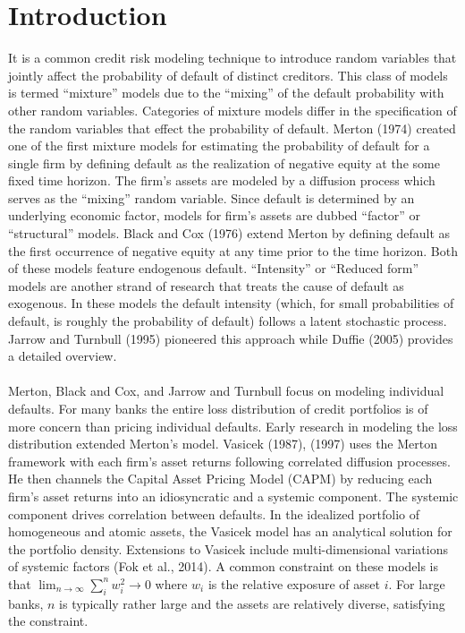 \documentclass[12pt]{article}
\theoremstyle{definition}
\begin{document}
\newpage
\section{Introduction}
It is a common credit risk modeling technique to introduce random variables that jointly affect the probability of default of distinct creditors.  This class of models is termed ``mixture'' models due to the ``mixing'' of the default probability with other random variables.  Categories of mixture models differ in the specification of the random variables that effect the probability of default.  Merton (1974) created one of the first mixture models for estimating the probability of default for a single firm by defining default as the realization of negative equity at the some fixed time horizon.  The firm's assets are modeled by a diffusion process which serves as the ``mixing'' random variable.  Since default is determined by an underlying economic factor, models for firm's assets are dubbed ``factor'' or ``structural'' models.  Black and Cox (1976) extend Merton by defining default as the first occurrence of negative equity at any time prior to the time horizon.  Both of these models feature endogenous default.  ``Intensity'' or ``Reduced form'' models are another strand of research that treats the cause of default as exogenous.  In these models the default intensity (which, for small probabilities of default, is roughly the probability of default) follows a latent stochastic process.  Jarrow and Turnbull (1995) pioneered this approach while Duffie (2005) provides a detailed overview.    
\\
\\
Merton,  Black and Cox, and Jarrow and Turnbull focus on modeling individual defaults.  For many banks the entire loss distribution of credit portfolios is of more concern than pricing individual defaults.  Early research in modeling the loss distribution extended Merton's model.  Vasicek (1987), (1997) uses the Merton framework with each firm's asset returns following correlated diffusion processes.  He then channels the Capital Asset Pricing Model (CAPM) by reducing each firm's asset returns into an idiosyncratic and a systemic component.  The systemic component drives correlation between defaults.  In the idealized portfolio of homogeneous and atomic assets, the Vasicek model has an analytical solution for the portfolio density.  Extensions to Vasicek include multi-dimensional variations of systemic factors (Fok et al., 2014).  A common constraint on these models is that \(\lim_{n\to \infty} \sum_i ^n w_i ^2 \to 0\) where \(w_i\) is the relative exposure of asset \(i\).  For large banks, \(n\) is typically rather large and the assets are relatively diverse, satisfying the constraint.
\end{document}
